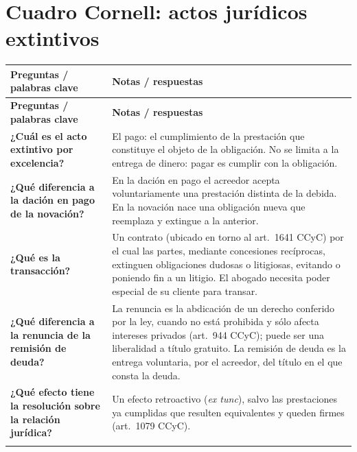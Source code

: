 \documentclass[12pt,oneside]{book}
\newlength{\cornellL}
\newlength{\cornellR}
\begin{document}
\section{Cuadro Cornell: actos jurídicos extintivos}

{\renewcommand{\arraystretch}{1.2}
\begin{longtable}{
    >{\raggedright\arraybackslash}p{\cornellL}
    >{\raggedright\arraybackslash}p{\cornellR}
}
\toprule
\textbf{Preguntas / palabras clave} &
\textbf{Notas / respuestas} \\
\midrule
\endfirsthead

\toprule
\textbf{Preguntas / palabras clave} &
\textbf{Notas / respuestas} \\
\midrule
\endhead

\textbf{¿Cuál es el acto extintivo por excelencia?} &
El pago: el cumplimiento de la prestación que constituye el objeto de la obligación. No se limita a la entrega de dinero: pagar es cumplir con la obligación. \\
\addlinespace

\textbf{¿Qué diferencia a la dación en pago de la novación?} &
En la dación en pago el acreedor acepta voluntariamente una prestación distinta de la debida. En la novación nace una obligación nueva que reemplaza y extingue a la anterior. \\
\addlinespace

\textbf{¿Qué es la transacción?} &
Un contrato (ubicado en torno al art.~1641 CCyC) por el cual las partes, mediante concesiones recíprocas, extinguen obligaciones dudosas o litigiosas, evitando o poniendo fin a un litigio. El abogado necesita poder especial de su cliente para transar. \\
\addlinespace

\textbf{¿Qué diferencia a la renuncia de la remisión de deuda?} &
La renuncia es la abdicación de un derecho conferido por la ley, cuando no está prohibida y sólo afecta intereses privados (art.~944 CCyC); puede ser una liberalidad a título gratuito. La remisión de deuda es la entrega voluntaria, por el acreedor, del título en el que consta la deuda. \\
\addlinespace

\textbf{¿Qué efecto tiene la resolución sobre la relación jurídica?} &
Un efecto retroactivo (\textit{ex tunc}), salvo las prestaciones ya cumplidas que resulten equivalentes y queden firmes (art.~1079 CCyC). \\
\addlinespace


\end{longtable}}
\end{document}
